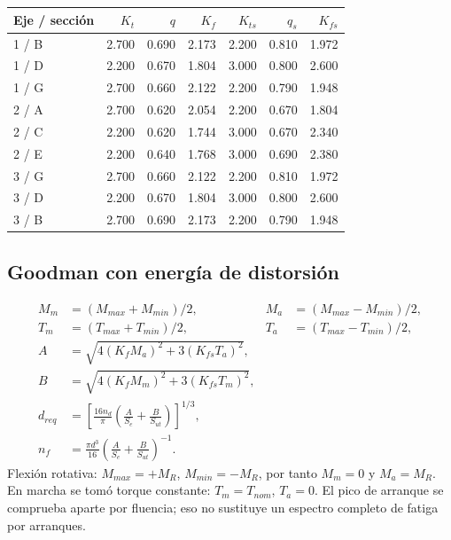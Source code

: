 \documentclass[11pt,a4paper]{article}
\begin{document}
\begin{center}\small\begin{tabular}{lrrrrrr}\toprule

Eje / sección & $K_t$ & $q$ & $K_f$ & $K_{ts}$ & $q_s$ & $K_{fs}$ \\ \midrule

1 / B & 2.700 & 0.690 & 2.173 & 2.200 & 0.810 & 1.972 \\

1 / D & 2.200 & 0.670 & 1.804 & 3.000 & 0.800 & 2.600 \\

1 / G & 2.700 & 0.660 & 2.122 & 2.200 & 0.790 & 1.948 \\

2 / A & 2.700 & 0.620 & 2.054 & 2.200 & 0.670 & 1.804 \\

2 / C & 2.200 & 0.620 & 1.744 & 3.000 & 0.670 & 2.340 \\

2 / E & 2.200 & 0.640 & 1.768 & 3.000 & 0.690 & 2.380 \\

3 / G & 2.700 & 0.660 & 2.122 & 2.200 & 0.810 & 1.972 \\

3 / D & 2.200 & 0.670 & 1.804 & 3.000 & 0.800 & 2.600 \\

3 / B & 2.700 & 0.690 & 2.173 & 2.200 & 0.790 & 1.948 \\

\bottomrule\end{tabular}\end{center}

\subsection{Goodman con energía de distorsión}
\begin{align*}
M_m&=(M_{max}+M_{min})/2,&M_a&=(M_{max}-M_{min})/2,\\
T_m&=(T_{max}+T_{min})/2,&T_a&=(T_{max}-T_{min})/2,\\
A&=\sqrt{4(K_fM_a)^2+3(K_{fs}T_a)^2},\\
B&=\sqrt{4(K_fM_m)^2+3(K_{fs}T_m)^2},\\
d_{req}&=\left[\frac{16n_d}{\pi}\left(\frac A{S_e}+\frac B{S_{ut}}\right)\right]^{1/3},\\
n_f&=\frac{\pi d^3}{16}\left(\frac A{S_e}+\frac B{S_{ut}}\right)^{-1}.
\end{align*}
Flexión rotativa: $M_{max}=+M_R$, $M_{min}=-M_R$, por tanto $M_m=0$ y $M_a=M_R$. En marcha se tomó torque constante: $T_m=T_{nom}$, $T_a=0$. El pico de arranque se comprueba aparte por fluencia; eso no sustituye un espectro completo de fatiga por arranques.
\end{document}
